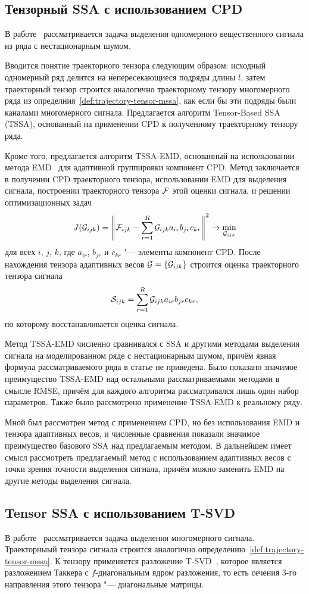 \documentclass[specialist,
  substylefile=spbu_report.rtx,
subf,href,colorlinks=true, 12pt]{disser}
\theoremstyle{plain}
\theoremstyle{definition}
\theoremstyle{remark}
\begin{document}
\subsection{Тензорный SSA с использованием CPD}
В работе~\cite{TSSA} рассматривается задача выделения одномерного
вещественного сигнала из ряда с нестационарным шумом.

Вводится понятие траекторного тензора следующим образом: исходный
одномерный ряд делится на непересекающиеся подряды длины $l$, затем
траекторный тензор строится аналогично траекторному тензору
многомерного ряда из определния~\ref{def:trajectory-tensor-mssa}, как
если бы эти подряды были каналами многомерного сигнала.
Предлагается алгоритм Tensor-Based SSA (TSSA), основанный на применении CPD
к полученному траекторному тензору ряда.

Кроме того, предлагается алгоритм TSSA-EMD, основанный на
использовании метода EMD~\cite{Lin2005} для адаптивной группировки
компонент CPD.
Метод заключается в получении CPD траекторного тензора, использовании
EMD для выделения сигнала, построении траекторного тензора $\mathcal{F}$
этой оценки сигнала, и решении оптимизационных задач
\[
  J(\mathcal{G}_{ijk}) = \left\|\mathcal{F}_{ijk} - \sum_{r=1}^{R}\mathcal{G}_{ijk}
  a_{ir} b_{jr}
  c_{kr}\right\|^2 \to \min_{\mathcal{G}_{ijk}}
\]
для всех $i$, $j$, $k$, где $a_{ir}$, $b_{jr}$ и $c_{kr}$ "---
элементы компонент CPD.
После нахождения тензора адаптивных весов $\mathcal{G}=\{\mathcal{G}_{ijk}\}$
строится оценка
траекторного тензора сигнала
\[
  \mathcal{S}_{ijk} = \sum_{r=1}^{R}\mathcal{G}_{ijk} a_{ir} b_{jr} c_{kr},
\]
по которому восстанавливается оценка сигнала.

Метод TSSA-EMD численно сравнивался с SSA и другими методами
выделения сигнала на моделированном ряде с
нестационарным шумом, причём явная
формула рассматриваемого ряда в статье не приведена.
Было показано значимое преимущество TSSA-EMD над остальными
рассматриваемыми методами в смысле RMSE, причём для каждого алгоритма
рассматривался лишь один набор параметров.
Также было рассмотрено применение TSSA-EMD к реальному ряду.

Мной был рассмотрен метод с применением CPD, но без использования EMD
и тензора адаптивных весов, и численные сравнения показали значимое
преимущество
базового SSA над предлагаемым методом.
В дальнейшем имеет смысл рассмотреть предлагаемый метод с
использованием адаптивных весов с точки зрения точности выделения
сигнала, причём можно заменить EMD на другие методы выделения сигнала.

\subsection{Tensor SSA с использованием T-SVD}
В работе~\cite{TrungLe2024} рассматривается задача выделения
многомерного сигнала.
Траекторныый тензора сигнала строится аналогично
определению~\ref{def:trajectory-tensor-mssa}.
К тензору применяется разложение T-SVD~\cite{Kilmer2011,Kilmer2013}, которое
является разложением Таккера с $f$-диагональным ядром разложения, то
есть сечения 3-го направления этого тензора "--- диагональные матрицы.
\end{document}
